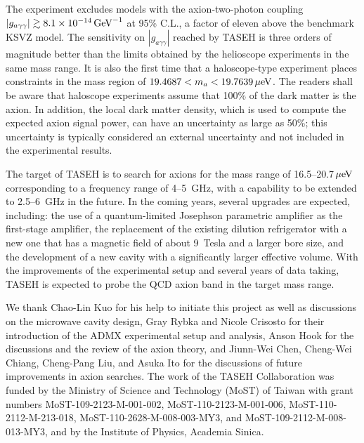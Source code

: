 \documentclass[%
reprint, %
superscriptaddress,
 amsmath,amssymb,
 aps
]{revtex4-2}
\begin{document}
The experiment excludes models with the 
axion-two-photon coupling $\left|g_{a\gamma\gamma}\right|\gtrsim 8.1\times 10^{-14}\,\text{Ge\hspace{-.08em}V}^{-1}$ at 95\% C.L.,
 a factor of eleven above the benchmark KSVZ model. The sensitivity on 
$\left|g_{a\gamma\gamma}\right|$ reached by TASEH 
is three orders of magnitude better than the limits obtained by 
the helioscope experiments in the same mass range.  
It is also the first time that a haloscope-type experiment places 
constraints in the mass region of 
$19.4687 < m_a < 19.7639 \,\mu\text{e\hspace{-.08em}V}$. 
The readers shall be aware that haloscope 
experiments assume that 100\% of the dark matter is the axion. In addition, 
the local dark matter density, which is used to compute the expected axion 
signal power, can have an uncertainty as large as 50\%; this uncertainty 
is typically considered an external 
uncertainty and not included in the experimental results. 

The target of TASEH is to search for axions for the mass range of 
16.5--20.7$\,\mu\text{e\hspace{-.08em}V}$ corresponding to a frequency range 
of 4--5~GHz, with a capability to be extended to 2.5--6~GHz in the future. 
In the coming years, several upgrades are expected, including: the use of a 
quantum-limited Josephson parametric amplifier as the first-stage amplifier, 
the replacement of the existing dilution refrigerator with a new one that has 
a magnetic field of about 9~Tesla and a larger bore size, and the development 
of a new cavity with a significantly larger effective volume. 
With the improvements of the experimental setup and several years of data 
taking, TASEH is expected to probe the QCD axion band in the target mass range.





\begin{acknowledgments}
We thank Chao-Lin Kuo for his help to initiate this project as well as 
discussions on the microwave cavity design, Gray Rybka and Nicole Crisosto 
for their introduction of the ADMX experimental 
setup and analysis, Anson Hook for the discussions and the review of the 
axion theory, and Jiunn-Wei Chen, Cheng-Wei Chiang, Cheng-Pang Liu, and 
Asuka Ito for the discussions of future improvements in axion searches.  
  The work of the TASEH Collaboration was funded by 
the Ministry of Science and Technology (MoST) of Taiwan with grant numbers 
MoST-109-2123-M-001-002, MoST-110-2123-M-001-006, MoST-110-2112-M-213-018, 
MoST-110-2628-M-008-003-MY3, 
and MoST-109-2112-M-008-013-MY3, and by the Institute of Physics, Academia 
Sinica. 

\end{acknowledgments}
\end{document}
